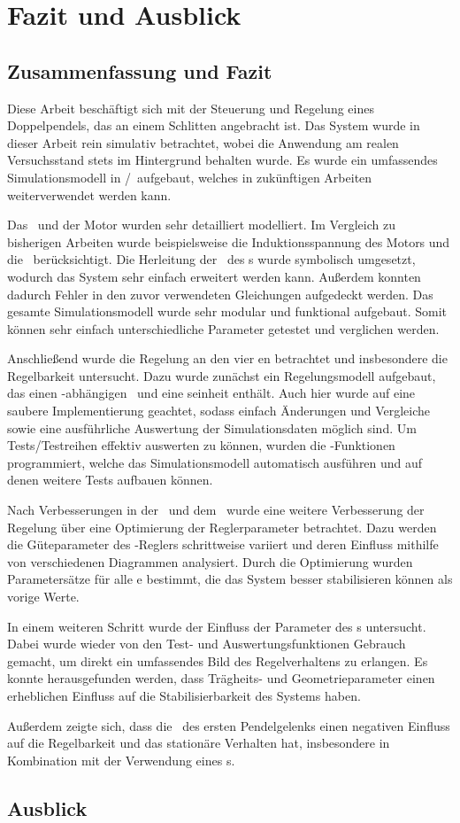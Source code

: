 \chapter{Fazit und Ausblick}

\section{Zusammenfassung und Fazit}

Diese Arbeit beschäftigt sich mit der Steuerung und Regelung eines Doppelpendels, das an einem Schlitten angebracht ist.
Das System wurde in dieser Arbeit rein simulativ betrachtet, wobei die Anwendung am realen Versuchsstand stets im Hintergrund behalten wurde.
Es wurde ein umfassendes Simulationsmodell in \ml/\sm\ aufgebaut, welches in zukünftigen Arbeiten weiterverwendet werden kann.

Das \spds\ und der Motor wurden sehr detailliert modelliert.
Im Vergleich zu bisherigen Arbeiten wurde beispielsweise die Induktionsspannung des Motors und die \crb\ berücksichtigt.
Die Herleitung der \bwgl\ des \spds s wurde symbolisch umgesetzt, wodurch das System sehr einfach erweitert werden kann.
Außerdem konnten dadurch Fehler in den zuvor verwendeten Gleichungen aufgedeckt werden.
Das gesamte Simulationsmodell wurde sehr modular und funktional aufgebaut.
Somit können sehr einfach unterschiedliche Parameter getestet und verglichen werden.

Anschließend wurde die Regelung an den vier \ap en betrachtet und insbesondere die Regelbarkeit untersucht.
Dazu wurde zunächst ein Regelungsmodell aufgebaut, das einen \ap-abhängigen \zsr\ und eine \vorst seinheit enthält.
Auch hier wurde auf eine saubere Implementierung geachtet, sodass einfach Änderungen und Vergleiche sowie eine ausführliche Auswertung der Simulationsdaten möglich sind.
Um Tests/Testreihen effektiv auswerten zu können, wurden die \xots-Funktionen programmiert, welche das Simulationsmodell automatisch ausführen und auf denen weitere Tests aufbauen können.

Nach Verbesserungen in der \vorst\ und dem \beob\ wurde eine weitere Verbesserung der Regelung über eine Optimierung der Reglerparameter betrachtet.
Dazu werden die Güteparameter des \ricc-Reglers schrittweise variiert und deren Einfluss mithilfe von verschiedenen Diagrammen analysiert.
Durch die Optimierung wurden Parametersätze für alle \ap e bestimmt, die das System besser stabilisieren können als vorige Werte.

In einem weiteren Schritt wurde der Einfluss der Parameter des \dpd s untersucht.
Dabei wurde wieder von den Test- und Auswertungsfunktionen Gebrauch gemacht, um direkt ein umfassendes Bild des Regelverhaltens zu erlangen.
Es konnte herausgefunden werden, dass Trägheits- und Geometrieparameter einen erheblichen Einfluss auf die Stabilisierbarkeit des Systems haben.

Außerdem zeigte sich, dass die \crb\ des ersten Pendelgelenks einen negativen Einfluss auf die Regelbarkeit und das stationäre Verhalten hat, insbesondere in Kombination mit der Verwendung eines \beob s.


\traj

  

\section{Ausblick}


